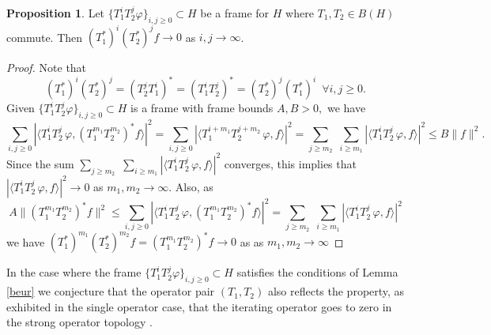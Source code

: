 \documentclass[12pt,reqno]{amsart}
\theoremstyle{definition}
\theoremstyle{definition}
\newtheorem{proposition}[theorem]{Proposition}
\numberwithin{equation}{section}
\begin{document}
\begin{proposition}
    Let $\{T_1^iT_2^j\varphi\}_{i,j \geq 0} \subset H$ be a frame for $H$  where $T_1, T_2  \in B(H)$ commute. Then $(T_1^*)^i(T_2^*)^jf \to 0$ as $i, j \to \infty$.
\end{proposition}
\begin{proof}
    Note that 
    \begin{displaymath}
        (T_1^*)^i(T_2^*)^j = (T_2^jT_1^i)^* = (T_1^iT_2^j)^* = (T_2^*)^j(T_1^*)^i \, \, \, \forall i, j \geq 0.
        \end{displaymath}
Given $\{T_1^iT_2^j\varphi\}_{i,j \geq 0} \subset H$ is a frame with frame bounds $A , B >0, $ we have 
\begin{displaymath}
\underset{i, j \geq 0}{\sum}|\langle T_{1}^iT_{2}^j \, \varphi, (T_{1}^{m_1}T_{2}^{m_2})^* f \rangle |^2 =  \underset{i, j \geq 0}{\sum} |\langle T_{1}^{i+m_1}T_{2}^{j + m_2} \, \varphi, f \rangle |^2  =  \underset{j \geq m_2}{\sum} \, \, \underset{i \geq m_1}{\sum}|\langle T_{1}^{i}T_{2}^{j} \, \varphi, f \rangle |^2 \leq B \|f\|^2.
\end{displaymath}
Since the sum $\underset{j \geq m_2}{\sum} \, \, \underset{i \geq m_1}{\sum}|\langle T_{1}^{i}T_{2}^{j} \, \varphi, f \rangle |^2 $ converges, this implies that $|\langle T_{1}^{i}T_{2}^{j} \, \varphi, f \rangle |^2 \to 0$ as $m_1, m_2 \to \infty$. Also, as 
\begin{displaymath}
A \|(T_{1}^{m_1}T_{2}^{m_2})^* f\|^2 \leq \underset{i, j \geq 0}{\sum}|\langle T_{1}^iT_{2}^j \, \varphi, (T_{1}^{m_1}T_{2}^{m_2})^* f \rangle |^2  = \underset{j \geq m_2}{\sum} \, \, \underset{i \geq m_1}{\sum}|\langle T_{1}^{i}T_{2}^{j} \, \varphi, f \rangle |^2 
\end{displaymath}
we have $(T_1^*)^{m_1} (T_2^*)^{m_2}f = (T_{1}^{m_1}T_{2}^{m_2})^* f \to 0$ as as $m_1, m_2 \to \infty$
\end{proof}

In the case where the  frame $\{T_1^iT_2^j\varphi\}_{i,j \geq 0} \subset H$ satisfies the conditions of Lemma \ref{beur} we conjecture that the operator pair $(T_1, T_2)$ also reflects the property, as exhibited in the single operator case, that the iterating operator goes to zero in the strong operator topology \cite{CHP20}.
\end{document}
